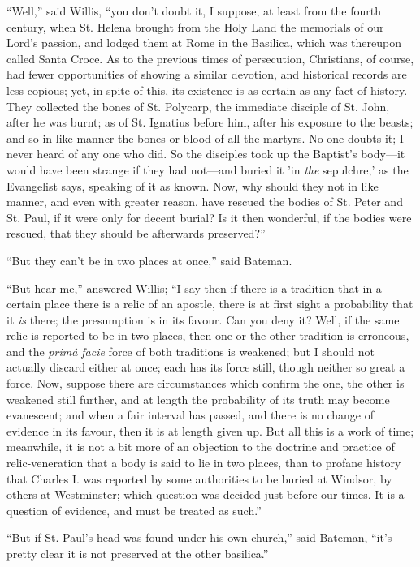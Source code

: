 ``Well,'' said Willis, ``you don't doubt it, I suppose,
at least from the fourth century, when St. Helena brought from the
Holy Land the memorials of our Lord's passion, and lodged them at Rome
in the Basilica, which was thereupon called Santa Croce. As to the
previous times of persecution, Christians, of course, had fewer
opportunities of showing a similar devotion, and historical records
are less copious; yet, in spite of this, its existence is as certain
as any fact of history. They collected the bones of St. Polycarp, the
immediate disciple of St. John, after he was burnt; as of St. Ignatius
before him, after his exposure to the beasts; and so in like
manner the bones or blood of all the martyrs. No one doubts it; I
never heard of any one who did. So the disciples took up the Baptist's
body—it would have been strange if they had not—and buried it 'in \emph{the}
sepulchre,' as the Evangelist says, speaking of it as known. Now, why
should they not in like manner, and even with greater reason, have
rescued the bodies of St. Peter and St. Paul, if it were only for
decent burial? Is it then wonderful, if the bodies were rescued, that
they should be afterwards preserved?''

``But they can't be in two places at once,'' said Bateman.

``But hear me,'' answered Willis; ``I say then if there
is a tradition that in a certain place there is a relic of an apostle,
there is at first sight a probability that it \emph{is} there; the
presumption is in its favour. Can you deny it? Well, if the same relic
is reported to be in two places, then one or the other tradition is
erroneous, and the \emph{primâ facie} force of both traditions is
weakened; but I should not actually discard either at once; each has
its force still, though neither so great a force. Now, suppose there
are circumstances which confirm the one, the other is weakened still
further, and at length the probability of its truth may become
evanescent; and when a fair interval has passed, and there is no
change of evidence in its favour, then it is at length given up. But
all this is a work of time; meanwhile, it is not a bit more of an
objection to the doctrine and practice of relic-veneration that a body
is said to lie in two places, than to profane history that
Charles I. was reported by some authorities to be buried at Windsor,
by others at Westminster; which question was decided just before our
times. It is a question of evidence, and must be treated as
such.''

``But if St. Paul's head was found under his own church,''
said Bateman, ``it's pretty clear it is not preserved at the other
basilica.''

